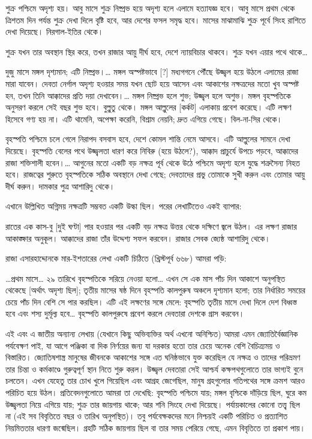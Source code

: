 শুক্র পশ্চিমে অদৃশ্য হয়। আবু মাসে শুক্র নিষ্প্রভ হয়ে অদৃশ্য হলে এলামে হত্যাযজ্ঞ হবে। আবু মাসে প্রথম থেকে ত্রিশতম দিন পর্যন্ত শুক্র দেখা দিলে বৃষ্টি হবে, আর দেশের ফসল সমৃদ্ধ হবে। মাসের মাঝামাঝি শুক্র পূর্বে সিংহ রাশিতে দেখা দিয়েছে। নিরগাল-ইতির থেকে।

শুক্র যখন তার অবস্থান স্থির করে, তখন রাজার আয়ু দীর্ঘ হবে, দেশে ন্যায়বিচার থাকবে। শুক্র যখন এয়ার পথে থাকে…

দুজু মাসে মঙ্গল দৃশ্যমান; এটি নিষ্প্রভ।… মঙ্গল অস্পষ্টভাবে [?] মধ্যগগনে পৌঁছে উজ্জ্বল হয়ে উঠলে এলামের রাজা মারা যাবেন। দেবতা নের্গাল অদৃশ্য হওয়ার সময় যখন ছোট হয়ে আসেন এবং আকাশের নক্ষত্রদের মতো খুব অস্পষ্ট হন, তখন তিনি আক্কাদের প্রতি দয়া দেখাবেন।… মঙ্গল নিষ্প্রভ হলে শুভ; উজ্জ্বল হলে অশুভ। মঙ্গল বৃহস্পতিকে অনুসরণ করলে সেই বছর শুভ হবে। বুল্লুতু থেকে। 
মঙ্গল আল্লুলের [কর্কট] এলাকায় প্রবেশ করেছে। এটি লক্ষণ হিসেবে গণ্য হয় না। এটি থামেনি, অপেক্ষা করেনি, বিশ্রাম নেয়নি; দ্রুত এগিয়ে গেছে। বিল-না-সির থেকে।

বৃহস্পতি পশ্চিমে চলে গেলে নিরাপদ বসবাস হবে, দেশে কোমল শান্তি নেমে আসবে। এটি আল্লুলের সামনে দেখা দিয়েছে। বৃহস্পতি বেলের পথে উজ্জ্বলতা ধারণ করে নিবিরু (হয়ে উঠলে?), আক্কাদ প্রাচুর্যে উপচে পড়বে, আক্কাদের রাজা শক্তিশালী হবেন।… আগুনের মতো একটি বড় নক্ষত্র পূর্ব থেকে উঠে পশ্চিমে অদৃশ্য হলে যুদ্ধে শত্রুসৈন্য নিহত হবে। রাজত্বের শুরুতে বৃহস্পতিকে সঠিক অবস্থানে দেখা গেছে; দেবতাদের প্রভু তোমাকে সুখী করুন এবং তোমার আয়ু দীর্ঘ করুন। দামকার পুত্র আশারিদু থেকে।

এখানে উল্লিখিত অগ্নিময় নক্ষত্রটি সম্ভবত একটি উল্কা ছিল। পরের লেখাটিতেও একই ব্যাপার:

রাতের এক কাস-বু [দুই ঘণ্টা] পার হওয়ার পর একটি বড় নক্ষত্র উত্তর থেকে দক্ষিণে জ্বলে উঠল। এর লক্ষণ রাজার আকাঙ্ক্ষার অনুকূল। আক্কাদের রাজা তাঁর উদ্দেশ্য সফল করবেন। রাজার সেবক জ্যেষ্ঠ আশারিদু থেকে।

রাজা এসারহাদ্দোনকে মার-ইশতারের লেখা একটি চিঠিতে (খ্রিস্টপূর্ব ৬৬৮) আমরা পড়ি:

…প্রথম মাসে… ২৯ তারিখে বৃহস্পতিকে সরিয়ে নেওয়া হলো… এখন সে এক মাস পাঁচ দিন আকাশে অনুপস্থিত থেকেছে [অর্থাৎ অদৃশ্য ছিল]; তৃতীয় মাসের ষষ্ঠ দিনে বৃহস্পতি কালপুরুষ অঞ্চলে দৃশ্যমান হলো; তার নির্ধারিত সময়ের চেয়ে পাঁচ দিন বেশি সে পার করছিল। এটি এই লক্ষণের সঙ্গে মেলে: বৃহস্পতি তৃতীয় মাসে দেখা দিলে দেশ বিধ্বস্ত হবে এবং শস্য দুর্মূল্য হবে… বৃহস্পতি কালপুরুষে প্রবেশ করলে দেবতারা দেশকে গ্রাস করবেন।

এই এবং এ জাতীয় অন্যান্য লেখায় (যেখানে কিছু অভিব্যক্তির অর্থ এখনো অনিশ্চিত) আমরা এমন জ্যোতির্বৈজ্ঞানিক পর্যবেক্ষণ পাই, যা আগে পঞ্জিকা বা দিক নির্ণয়ের জন্য যা দরকার হতো তার চেয়ে অনেক বেশি বৈচিত্র্যময় ও বিস্তারিত। জ্যোতিষশাস্ত্র মানুষের জীবনকে আকাশের সঙ্গে এত ঘনিষ্ঠভাবে যুক্ত করেছিল যে নক্ষত্র ও তাদের পরিভ্রমণ তার চিন্তা ও কর্মকাণ্ডে গুরুত্বপূর্ণ স্থান নিতে শুরু করল। উজ্জ্বল দেবতারা সেই আশ্চর্য কক্ষপথগুলোতে তার ভাগ্যই বুনে চলতেন। এখন যেহেতু তার চোখ খুলে গিয়েছিল এবং আগ্রহ জেগেছিল, মানুষ গ্রহগুলোর গতিপথের সঙ্গে ক্রমশ আরও পরিচিত হয়ে উঠল। প্রতিবেদনগুলোতে আমরা তা দেখেছি: বৃহস্পতি পশ্চিমে যায়; মঙ্গল বৃশ্চিকে দাঁড়িয়ে ছিল, ঘুরে কম উজ্জ্বলতা নিয়ে এগিয়ে যায়; শুক্র তার জায়গায় থাকে; আর শনি সিংহে দেখা দিয়েছে। পর্যায়কালের কোনো তত্ত্ব ছিল না (এই সব বিবৃতিতে বছর ও তারিখ অনুপস্থিত)। তবু পর্যবেক্ষকদের মনে নিশ্চয়ই একটি পরিচিত ও প্রত্যাশিত নিয়মিততার ধারণা জন্মেছিল। গ্রহটি সঠিক জায়গায় ছিল বা তার সময় পেরিয়ে গেছে, এমন বিবৃতিতে তা প্রকাশ পায়।

